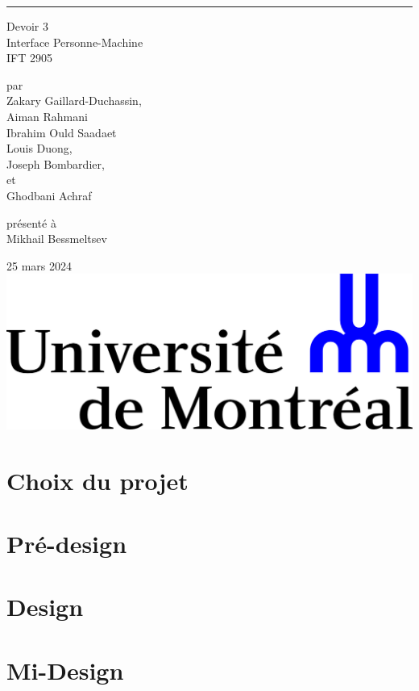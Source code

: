 \documentclass{article}
\begin{document}
\begin{titlepage}
  \centering
  
  \rule{\textwidth}{0px}
  \vspace{10mm}
  
  \Huge{Devoir 3} \\
  \vspace{10mm}
  \Large Interface Personne-Machine \\
  IFT 2905
  
  \vspace{30mm}
  \large par \\ \vspace{3mm}
  Zakary Gaillard-Duchassin, \\ \vspace{3mm}
  Aiman Rahmani \\ \vspace{2mm}
  Ibrahim Ould Saadaet \\ \vspace{3mm}
  Louis Duong, \\ \vspace{3mm}
  Joseph Bombardier, \\ \vspace{2mm}
  et \\ \vspace{2mm}
  Ghodbani Achraf
  
  \vspace{30mm}
  présenté à \\ \vspace{3mm}
  Mikhail Bessmeltsev
  
  \vfill
  25 mars 2024 \\ \vspace{3mm}
  \includegraphics[scale=0.55]{logo-udem.png}
\end{titlepage}
\newpage


\section{Choix du projet}

\section{Pré-design}

\section{Design}

\section{Mi-Design}
\end{document}
